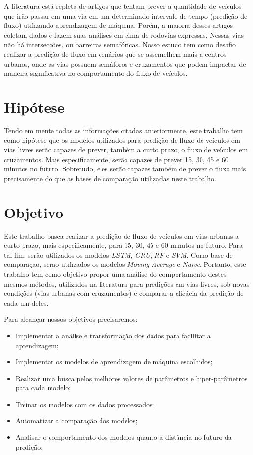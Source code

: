 A literatura está repleta de artigos que tentam prever a quantidade de veículos que irão passar em uma via em um determinado intervalo de tempo (predição de fluxo) utilizando aprendizagem de máquina. Porém, a maioria desses artigos coletam dados e fazem suas análises em cima de rodovias expressas. Nessas vias não há intersecções, ou barreiras semafóricas. Nosso estudo tem como desafio realizar a predição de fluxo em cenários que se assemelhem mais a centros urbanos, onde as vias possuem semáforos e cruzamentos que podem impactar de maneira significativa no comportamento do fluxo de veículos.

\section{Hipótese}

Tendo em mente todas as informações citadas anteriormente, este trabalho tem como hipótese que os modelos utilizados para predição de fluxo de veículos em vias livres serão capazes de prever, também a curto prazo, o fluxo de veículos em cruzamentos. Mais especificamente, serão capazes de prever 15, 30, 45 e 60 minutos no futuro. Sobretudo, eles serão capazes também de prever o fluxo mais precisamente do que as bases de comparação utilizadas neste trabalho.

\section{Objetivo}

Este trabalho busca realizar a predição de fluxo de veículos em vias urbanas a curto prazo, mais especificamente, para 15, 30, 45 e 60 minutos no futuro. Para tal fim, serão utilizados os modelos \textit{\acrfull{LSTM}}, \textit{\acrfull{GRU}}, \textit{\acrfull{RF}} e \textit{\acrfull{SVM}}. Como base de comparação, serão utilizados os modelos \textit{Moving Average} e \textit{Naive}. Portanto, este trabalho tem como objetivo propor uma análise do comportamento destes mesmos métodos, utilizados na literatura para predições em vias livres, sob novas condições (vias urbanas com cruzamentos) e comparar a eficácia da predição de cada um deles.

Para alcançar nossos objetivos precisaremos:

\begin{itemize}
    \item Implementar a análise e transformação dos dados para facilitar a aprendizagem;
    \item Implementar os modelos de aprendizagem de máquina escolhidos; 
    \item Realizar uma busca pelos melhores valores de parâmetros e hiper-parâmetros para cada modelo;
    \item Treinar os modelos com os dados processados;
    \item Automatizar a comparação dos modelos;
    \item Analisar o comportamento dos modelos quanto a distância no futuro da predição;
\end{itemize}

